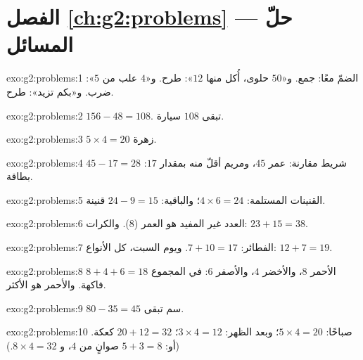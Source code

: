 \section*{الفصل \ref{ch:g2:problems} --- حلّ المسائل}

\begin{solution}{exo:g2:problems:1}
الضمّ معًا: جمع. و«$50$ حلوى، أُكل منها $12$»: طرح. و«$4$
علب من $5$»: ضرب. و«بكم تزيد»: طرح.
\end{solution}

\begin{solution}{exo:g2:problems:2}
$156 - 48 = 108$. تبقى $108$ سيارة.
\end{solution}

\begin{solution}{exo:g2:problems:3}
$5 \times 4 = 20$ زهرة.
\end{solution}

\begin{solution}{exo:g2:problems:4}
شريط مقارنة: عمر $45$، ومريم أقلّ منه بمقدار $17$:
$45 - 17 = 28$ بطاقة.
\end{solution}

\begin{solution}{exo:g2:problems:5}
القنينات المستلمة: $4 \times 6 = 24$؛ والباقية:
$24 - 9 = 15$ قنينة.
\end{solution}

\begin{solution}{exo:g2:problems:6}
العدد غير المفيد هو العمر ($8$). والكرات:
$23 + 15 = 38$.
\end{solution}

\begin{solution}{exo:g2:problems:7}
الفطائر: $7 + 10 = 17$. ويوم السبت، كل الأنواع:
$12 + 7 = 19$.
\end{solution}

\begin{solution}{exo:g2:problems:8}
الأحمر $8$، والأخضر $4$، والأصفر $6$: في المجموع $8 + 4 + 6 = 18$ فاكهة.
والأحمر هو الأكثر.
\end{solution}

\begin{solution}{exo:g2:problems:9}
$80 - 35 = 45$ سم تبقى.
\end{solution}

\begin{solution}{exo:g2:problems:10}
صباحًا: $5 \times 4 = 20$؛ وبعد الظهر: $3 \times 4 = 12$؛ 
$20 + 12 = 32$ كعكة. (أو: $5 + 3 = 8$ صوانٍ من $4$، و
$8 \times 4 = 32$.)
\end{solution}
